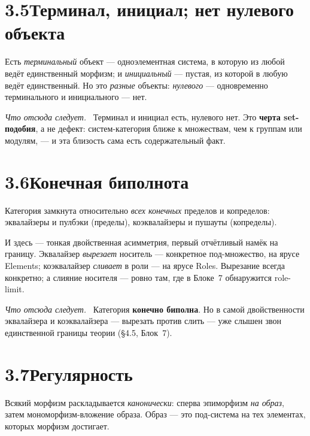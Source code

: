 \documentclass[12pt,a4paper]{article}
\newcommand{\rezultat}{\medskip\noindent\emph{Что отсюда следует.}\ }
\begin{document}
\section*{3.5\quad Терминал, инициал; нет нулевого объекта}

Есть \emph{терминальный} объект --- одноэлементная система, в которую из любой ведёт единственный
морфизм; и \emph{инициальный} --- пустая, из которой в любую ведёт единственный. Но это \emph{разные}
объекты: \emph{нулевого} --- одновременно терминального и инициального --- нет.

\rezultat
Терминал и инициал есть, нулевого нет. Это \textbf{черта set-подобия}, а не дефект: систем-категория
ближе к множествам, чем к группам или модулям, --- и эта близость сама есть содержательный факт.

\section*{3.6\quad Конечная биполнота}

Категория замкнута относительно \emph{всех конечных} пределов и копределов: эквалайзеры и
пулбэки (пределы), коэквалайзеры и пушауты (копределы).

И здесь --- тонкая двойственная асимметрия, первый отчётливый намёк на границу. Эквалайзер
\emph{вырезает} носитель --- конкретное под-множество, на ярусе Elements; коэквалайзер \emph{сливает}
в роли --- на ярусе Roles. Вырезание всегда конкретно; а слияние носителя --- ровно там, где в
Блоке~7 обнаружится role-limit.

\rezultat
Категория \textbf{конечно биполна}. Но в самой двойственности эквалайзера и коэквалайзера ---
вырезать против слить --- уже слышен звон единственной границы теории (§4.5, Блок~7).

\section*{3.7\quad Регулярность}

Всякий морфизм раскладывается \emph{канонически}: сперва эпиморфизм \emph{на образ}, затем
мономорфизм-вложение образа. Образ --- это под-система на тех элементах, которых морфизм достигает.
\end{document}
